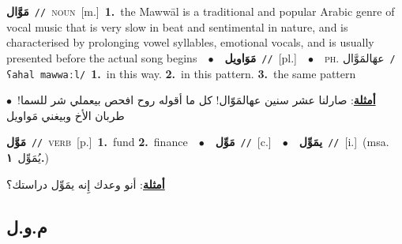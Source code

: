 \documentclass[10pt,a4paper,twoside]{article} %
\begin{document}
\begin{multicols}{2}
{\setlength\topsep{0pt}\textbf{\foreignlanguage{arabic}{مَوَّال}}\ {\color{gray}\texttt{//}\color{black}}\ \textsc{noun}\ [m.]\ \textbf{1.}~the Mawwāl is a traditional and popular Arabic genre of vocal music that is very slow in beat and sentimental in nature, and is characterised by prolonging vowel syllables, emotional vocals, and is usually presented before the actual song begins\ \ $\bullet$\ \ \setlength\topsep{0pt}\textbf{\foreignlanguage{arabic}{مَوَاويل}}\ {\color{gray}\texttt{//}\color{black}}\ [pl.]\ \ $\bullet$\ \ \textsc{ph.} \color{gray} \foreignlanguage{arabic}{عهَالمَوَّال}\color{black}\ {\color{gray}\texttt{/{\sffamily ʕahal mawwaːl}/}\color{black}}\ \textbf{1.}~in this way.  \textbf{2.}~in this pattern.  \textbf{3.}~the same pattern\  \begin{flushright}\color{gray}\foreignlanguage{arabic}{\textbf{\underline{\foreignlanguage{arabic}{أمثلة}}}: صارلنا عشر سنين عهالمَوّال! كل ما أقوله روح افحص بيعملي شر للسما!\ $\bullet$\ \  طربان الأخ وبيغني مَواويل}\end{flushright}\color{black}} \vspace{2mm}

{\setlength\topsep{0pt}\textbf{\foreignlanguage{arabic}{مَوَّل}}\ {\color{gray}\texttt{//}\color{black}}\ \textsc{verb}\ [p.]\ \textbf{1.}~fund  \textbf{2.}~finance\ \ $\bullet$\ \ \setlength\topsep{0pt}\textbf{\foreignlanguage{arabic}{مَوِّل}}\ {\color{gray}\texttt{//}\color{black}}\ [c.]\ \ $\bullet$\ \ \setlength\topsep{0pt}\textbf{\foreignlanguage{arabic}{يمَوِّل}}\ {\color{gray}\texttt{//}\color{black}}\ [i.]\ \color{gray}(msa. \foreignlanguage{arabic}{يُمَوِّل}~\foreignlanguage{arabic}{\textbf{١.}})\color{black}\  \begin{flushright}\color{gray}\foreignlanguage{arabic}{\textbf{\underline{\foreignlanguage{arabic}{أمثلة}}}: أنو وعدك إِنه يمَوِّل دراستك؟}\end{flushright}\color{black}} \vspace{2mm}

\vspace{-3mm}
\subsection*{\color{blue}\foreignlanguage{arabic}{م.و.ل}\color{blue}{ (ntws)}} 


\end{multicols}
\end{document}
